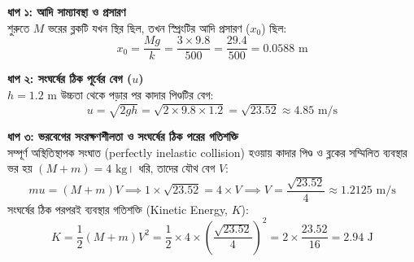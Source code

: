 \documentclass[12pt, a4paper]{article}
\begin{document}
\begin{tcolorbox}[solutionbox={সমাধান (Solution)}]
\noindent
\textbf{ধাপ ১: আদি সাম্যাবস্থা ও প্রসারণ} \\
শুরুতে $M$ ভরের ব্লকটি যখন স্থির ছিল, তখন স্প্রিংটির আদি প্রসারণ ($x_0$) ছিল:
$$x_0 = \frac{M g}{k} = \frac{3 \times 9.8}{500} = \frac{29.4}{500} = 0.0588\text{ m}$$

\vspace{0.5em}
\noindent
\textbf{ধাপ ২: সংঘর্ষের ঠিক পূর্বের বেগ ($u$)} \\
$h = 1.2\text{ m}$ উচ্চতা থেকে পড়ার পর কাদার পিণ্ডটির বেগ:
$$u = \sqrt{2gh} = \sqrt{2 \times 9.8 \times 1.2} = \sqrt{23.52} \approx 4.85\text{ m/s}$$

\vspace{0.5em}
\noindent
\textbf{ধাপ ৩: ভরবেগের সংরক্ষণশীলতা ও সংঘর্ষের ঠিক পরের গতিশক্তি} \\
সম্পূর্ণ অস্থিতিস্থাপক সংঘাত (perfectly inelastic collision) হওয়ায় কাদার পিণ্ড ও ব্লকের সম্মিলিত ব্যবস্থার ভর হয় $(M + m) = 4\text{ kg}$। ধরি, তাদের যৌথ বেগ $V$:
$$m u = (M + m) V \implies 1 \times \sqrt{23.52} = 4 \times V \implies V = \frac{\sqrt{23.52}}{4} \approx 1.2125\text{ m/s}$$
সংঘর্ষের ঠিক পরপরই ব্যবস্থার গতিশক্তি (Kinetic Energy, $K$):
$$K = \frac{1}{2} (M + m) V^2 = \frac{1}{2} \times 4 \times \left( \frac{\sqrt{23.52}}{4} \right)^2 = 2 \times \frac{23.52}{16} = 2.94\text{ J}$$

\vspace{1em}
\begin{center}
\end{center}
\end{tcolorbox}
\end{document}
